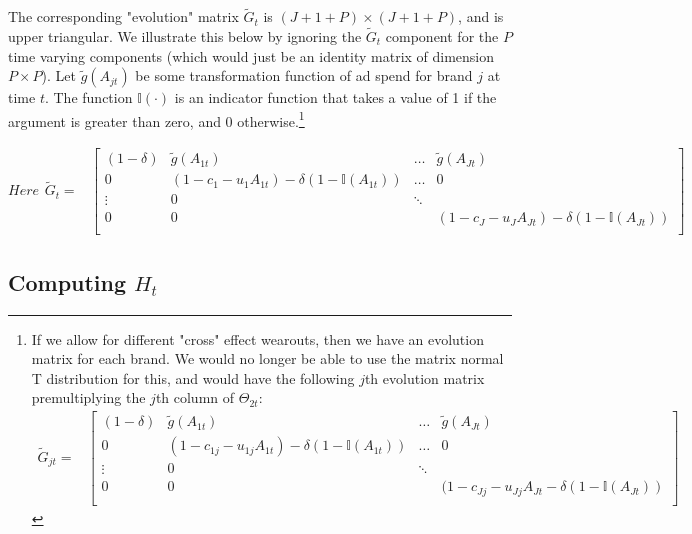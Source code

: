 \documentclass[letter,10pt]{article}
\newcommand{\Igtz}{\mathbb{I}}
\begin{document}
The corresponding "evolution" matrix $\tilde{G}_t$ is $(J+1+P)\times(J+1+P)$, and is upper triangular.  We illustrate
this below by ignoring the $\tilde{G}_t$ component for the $P$ time varying components (which would just be an identity matrix 
of dimension $P \times P$). Let
$\tilde{g}(A_{jt})$ be some transformation function of ad spend for
brand $j$ at time $t$.  The function $\Igtz(\cdot)$ is an indicator
function that takes a value of 1 if the argument is greater than zero,
and 0 otherwise.\footnote{If we allow for different "cross" effect wearouts, then we have an evolution matrix for each brand.  We would no longer
be able to use the matrix normal T distribution for this, and would have the following $j$th evolution matrix 
premultiplying the $j$th column of $\Theta_{2t}$:
\begin{equation}
\begin{array}{ll}
      \tilde{G}_{jt} = & \left[\begin{array}{cccl}
		 (1-\delta) & \tilde{g}(A_{1t}) & \ldots & \tilde{g}(A_{Jt}) \\
		0 & (1-c_{1j}-u_{1j} A_{1t}) - \delta(1-\Igtz(A_{1t})) & \ldots & 0 \\
\vdots & 0 & \ddots \\
		0 & 0 &  & (1-c_{Jj}-u_{Jj} A_{Jt} - \delta(1-\Igtz(A_{Jt})) \\
		\end{array}\right]
\end{array}
\end{equation}}  

\begin{equation}
Here\begin{array}{ll}
      \tilde{G}_t = & \left[\begin{array}{cccl}
		 (1-\delta) & \tilde{g}(A_{1t}) & \ldots & \tilde{g}(A_{Jt}) \\
		0 & (1-c_1 - u_1 A_{1t}) - \delta(1-\Igtz(A_{1t})) & \ldots & 0 \\
\vdots & 0 & \ddots \\
		0 & 0 &  & (1-c_J - u_J A_{Jt}) - \delta(1-\Igtz(A_{Jt})) \\
		\end{array}\right]
\end{array}
\end{equation}




\subsection*{Computing $H_t$}
\end{document}
